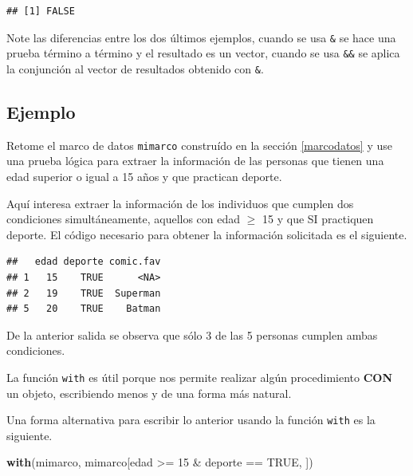 \documentclass[10pt,]{krantz}
\makeatletter
\newenvironment{Shaded}{\begin{snugshade}}{\end{snugshade}}
\newcommand{\KeywordTok}[1]{\textcolor[rgb]{0.13,0.29,0.53}{\textbf{{#1}}}}
\newcommand{\DecValTok}[1]{\textcolor[rgb]{0.00,0.00,0.81}{{#1}}}
\newcommand{\StringTok}[1]{\textcolor[rgb]{0.31,0.60,0.02}{{#1}}}
\newcommand{\OtherTok}[1]{\textcolor[rgb]{0.56,0.35,0.01}{{#1}}}
\newcommand{\NormalTok}[1]{{#1}}
\newenvironment{kframe}{%
\medskip{}
\setlength{\fboxsep}{.8em}
 \def\at@end@of@kframe{}%
 \ifinner\ifhmode%
  \def\at@end@of@kframe{\end{minipage}}%
  \begin{minipage}{\columnwidth}%
 \fi\fi%
 \def\FrameCommand##1{\hskip\@totalleftmargin \hskip-\fboxsep
 \colorbox{shadecolor}{##1}\hskip-\fboxsep
     \hskip-\linewidth \hskip-\@totalleftmargin \hskip\columnwidth}%
 \MakeFramed {\advance\hsize-\width
   \@totalleftmargin\z@ \linewidth\hsize
   \@setminipage}}%
 {\par\unskip\endMakeFramed%
 \at@end@of@kframe}
\renewenvironment{Shaded}{\begin{kframe}}{\end{kframe}}
\let\BeginKnitrBlock\begin \let\EndKnitrBlock\end
\makeatother
\begin{document}
\begin{verbatim}
## [1] FALSE
\end{verbatim}

Note las diferencias entre los dos últimos ejemplos, cuando se usa
\texttt{\&} se hace una prueba término a término y el resultado es un
vector, cuando se usa \texttt{\&\&} se aplica la conjunción al vector de
resultados obtenido con \texttt{\&}.

\subsection*{Ejemplo}\label{ejemplo-8}


Retome el marco de datos \texttt{mimarco} construído en la sección
\ref{marcodatos} y use una prueba lógica para extraer la información de
las personas que tienen una edad superior o igual a 15 años y que
practican deporte.

Aquí interesa extraer la información de los individuos que cumplen dos
condiciones simultáneamente, aquellos con edad \(\geq\) 15 y que SI
practiquen deporte. El código necesario para obtener la información
solicitada es el siguiente.

\begin{Shaded}
\end{Shaded}

\begin{verbatim}
##   edad deporte comic.fav
## 1   15    TRUE      <NA>
## 2   19    TRUE  Superman
## 5   20    TRUE    Batman
\end{verbatim}

De la anterior salida se observa que sólo 3 de las 5 personas cumplen
ambas condiciones.

 \BeginKnitrBlock{rmdtip}

La función \texttt{with} es útil porque nos permite realizar algún
procedimiento \textbf{CON} un objeto, escribiendo menos y de una forma
más natural.
\EndKnitrBlock{rmdtip}

Una forma alternativa para escribir lo anterior usando la función
\texttt{with} es la siguiente.

\begin{Shaded}
\begin{Highlighting}[]
\KeywordTok{with}\NormalTok{(mimarco, mimarco[edad >=}\StringTok{ }\DecValTok{15} \NormalTok{&}\StringTok{ }\NormalTok{deporte ==}\StringTok{ }\OtherTok{TRUE}\NormalTok{, ])}
\end{Highlighting}
\end{Shaded}
\end{document}

